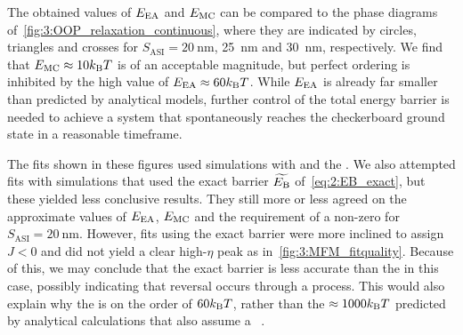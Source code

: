 
The obtained values of $E_\mathrm{EA}$ and $E_\mathrm{MC}$ can be compared to the phase diagrams of~\cref{fig:3:OOP_relaxation_continuous}, where they are indicated by circles, triangles and crosses for $S_\mathrm{ASI} = \SI{20}{\nano\metre}$, \SI{25}{\nano\metre} and \SI{30}{\nano\metre}, respectively.
We find that $\EMC \approx 10 \kBT$ is of an acceptable magnitude, but perfect ordering is inhibited by the high value of $\EEA \approx 60 \kBT$.
While $E_\mathrm{EA}$ is already far smaller than predicted by analytical models, further control of the total energy barrier is needed to achieve a system that spontaneously reaches the checkerboard ground state in a reasonable timeframe. \\\par

The fits shown in these figures used \hotspice simulations with  and the .
We also attempted fits with simulations that used the exact barrier $\widetilde{E_\mathrm{B}}$ of~\cref{eq:2:EB_exact}, but these yielded less conclusive results.
They still more or less agreed on the approximate values of $E_\mathrm{EA}$, $E_\mathrm{MC}$ and the requirement of a non-zero  for $S_\mathrm{ASI} = \SI{20}{\nano\metre}$.
However, fits using the exact barrier were more inclined to assign $J < 0$ and did not yield a clear high-$\eta$ peak as in~\cref{fig:3:MFM_fitquality}.
Because of this, we may conclude that the exact barrier is less accurate than the  in this case, possibly indicating that reversal occurs through a  process.
This would also explain why the  is on the order of $60 \kBT$, rather than the $\approx 1000 \kBT$ predicted by analytical calculations that also assume a ~\cite[Supp.4]{KUR-24}.

